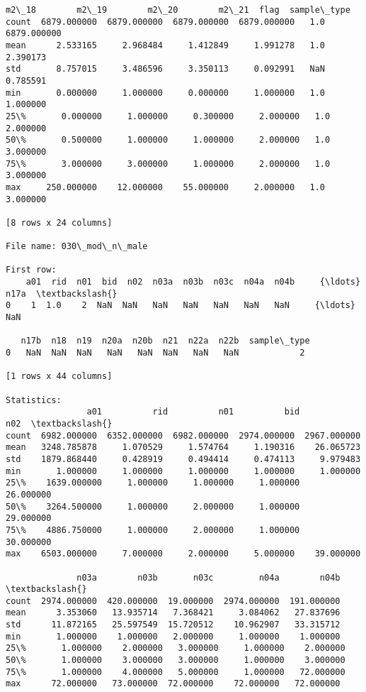 \documentclass[11pt]{article}
\begin{document}
\begin{Verbatim}[commandchars=\\\{\}]
             m2\_18        m2\_19        m2\_20        m2\_21  flag  sample\_type  
count  6879.000000  6879.000000  6879.000000  6879.000000   1.0  6879.000000  
mean      2.533165     2.968484     1.412849     1.991278   1.0     2.390173  
std       8.757015     3.486596     3.350113     0.092991   NaN     0.785591  
min       0.000000     1.000000     0.000000     1.000000   1.0     1.000000  
25\%       0.000000     1.000000     0.300000     2.000000   1.0     2.000000  
50\%       0.500000     1.000000     1.000000     2.000000   1.0     3.000000  
75\%       3.000000     3.000000     1.000000     2.000000   1.0     3.000000  
max     250.000000    12.000000    55.000000     2.000000   1.0     3.000000  

[8 rows x 24 columns]

File name: 030\_mod\_n\_male

First row: 
    a01  rid  n01  bid  n02  n03a  n03b  n03c  n04a  n04b     {\ldots}       n17a  \textbackslash{}
0    1  1.0    2  NaN  NaN   NaN   NaN   NaN   NaN   NaN     {\ldots}        NaN   

   n17b  n18  n19  n20a  n20b  n21  n22a  n22b  sample\_type  
0   NaN  NaN  NaN   NaN   NaN  NaN   NaN   NaN            2  

[1 rows x 44 columns]

Statistics: 
                a01          rid          n01          bid          n02  \textbackslash{}
count  6982.000000  6352.000000  6982.000000  2974.000000  2967.000000   
mean   3248.785878     1.070529     1.574764     1.190316    26.065723   
std    1879.868440     0.428919     0.494414     0.474113     9.979483   
min       1.000000     1.000000     1.000000     1.000000     1.000000   
25\%    1639.000000     1.000000     1.000000     1.000000    26.000000   
50\%    3264.500000     1.000000     2.000000     1.000000    29.000000   
75\%    4886.750000     1.000000     2.000000     1.000000    30.000000   
max    6503.000000     7.000000     2.000000     5.000000    39.000000   

              n03a        n03b       n03c         n04a        n04b  \textbackslash{}
count  2974.000000  420.000000  19.000000  2974.000000  191.000000   
mean      3.353060   13.935714   7.368421     3.084062   27.837696   
std      11.872165   25.597549  15.720512    10.962907   33.315712   
min       1.000000    1.000000   2.000000     1.000000    1.000000   
25\%       1.000000    2.000000   3.000000     1.000000    2.000000   
50\%       1.000000    3.000000   3.000000     1.000000    3.000000   
75\%       1.000000    4.000000   5.000000     1.000000   72.000000   
max      72.000000   73.000000  72.000000    72.000000   72.000000   


\end{Verbatim}
\end{document}
